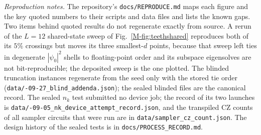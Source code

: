 \documentclass[aps,prb,onecolumn,superscriptaddress,longbibliography,floatfix]{revtex4-2}
\begin{document}
\emph{Reproduction notes.} The repository's \texttt{docs/\allowbreak REPRODUCE.md} maps each figure and the key quoted numbers to their scripts and data files and lists the known gaps. Two items behind quoted results do not regenerate exactly from source. A rerun of the $L=12$ shared-state sweep of Fig.~\ref{M-fig:teethshared} reproduces both of its $5\%$ crossings but moves its three smallest-$d$ points, because that sweep left ties in degenerate $|\psi_0|^2$ shells to floating-point order and its subspace eigensolves are not bit-reproducible; the deposited sweep is the one plotted. The blinded truncation instances regenerate from the seed only with the stored tie order (\texttt{data/-09-27\_blind\_addenda.json}); the sealed blinded files are the canonical record. The sealed $n_k$ test submitted no device job; the record of its two launches is \texttt{data/-09-05\_nk\_device\_\allowbreak attempt\_record.json}, and the transpiled CZ counts of all sampler circuits that were run are in \texttt{data/\allowbreak sampler\_cz\_count.json}. The design history of the sealed tests is in \texttt{docs/\allowbreak PROCESS\_RECORD.md}.


\FloatBarrier

\end{document}
